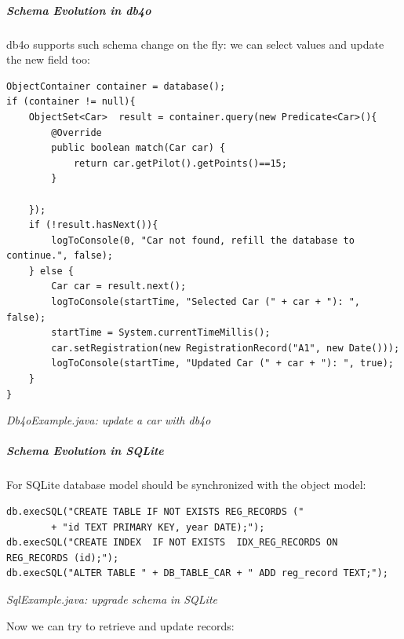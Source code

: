 \subparagraph*{Schema Evolution in db4o}

db4o supports such schema change on the fly: we can select values and update the new field too:

\begin{lstlisting}
ObjectContainer container = database();
if (container != null){
    ObjectSet<Car>  result = container.query(new Predicate<Car>(){
        @Override
        public boolean match(Car car) {
            return car.getPilot().getPoints()==15;
        }
        
    });
    if (!result.hasNext()){
        logToConsole(0, "Car not found, refill the database to continue.", false);
    } else {
        Car car = result.next();
        logToConsole(startTime, "Selected Car (" + car + "): ", false);
        startTime = System.currentTimeMillis();
        car.setRegistration(new RegistrationRecord("A1", new Date()));
        logToConsole(startTime, "Updated Car (" + car + "): ", true);
    }            
}
\end{lstlisting}

{\small\itshape Db4oExample.java: update a car with db4o\par}
\medskip

\subparagraph*{Schema Evolution in SQLite}

For SQLite database model should be synchronized with the object model:

\begin{lstlisting}
db.execSQL("CREATE TABLE IF NOT EXISTS REG_RECORDS ("
        + "id TEXT PRIMARY KEY, year DATE);");
db.execSQL("CREATE INDEX  IF NOT EXISTS  IDX_REG_RECORDS ON REG_RECORDS (id);");
db.execSQL("ALTER TABLE " + DB_TABLE_CAR + " ADD reg_record TEXT;");
\end{lstlisting}

{\small\itshape SqlExample.java: upgrade schema in SQLite\par}
\medskip

Now we can try to retrieve and update records:

